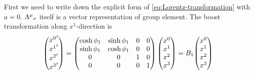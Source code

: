 First we need to write down the explicit form of \eqref{eq:Lorentz-transformation} with $a=0$. ${\Lambda^{\mu}}_{\nu}$ itself is a vector representation of group element. The boost transformation along $x^1$-direction is
\begin{equation} \label{eq:explicit-form-of-boost}
  \mqty({x^0}' \\ {x^1}' \\ {x^2}' \\{x^3}')
  = \mqty(\cosh \f_1 & \sinh \f_1 & 0 & 0 \\
          \sinh \f_1 & \cosh \f_1 & 0 & 0 \\
          0          &  0         & 1 & 0 \\
          0          &  0         & 0 & 1) \,
    \mqty(x^0 \\ x^1 \\ x^2 \\x^3)
  = B_1 \mqty(x^0 \\ x^1 \\ x^2 \\x^3)
\end{equation}

